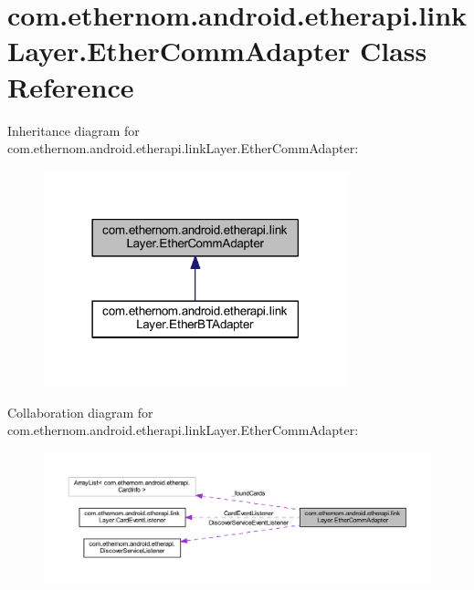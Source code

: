 \hypertarget{classcom_1_1ethernom_1_1android_1_1etherapi_1_1link_layer_1_1_ether_comm_adapter}{}\section{com.\+ethernom.\+android.\+etherapi.\+link\+Layer.\+Ether\+Comm\+Adapter Class Reference}
\label{classcom_1_1ethernom_1_1android_1_1etherapi_1_1link_layer_1_1_ether_comm_adapter}


Inheritance diagram for com.\+ethernom.\+android.\+etherapi.\+link\+Layer.\+Ether\+Comm\+Adapter\+:\nopagebreak
\begin{figure}[H]
\begin{center}
\leavevmode
\includegraphics[width=249pt]{classcom_1_1ethernom_1_1android_1_1etherapi_1_1link_layer_1_1_ether_comm_adapter__inherit__graph}
\end{center}
\end{figure}


Collaboration diagram for com.\+ethernom.\+android.\+etherapi.\+link\+Layer.\+Ether\+Comm\+Adapter\+:\nopagebreak
\begin{figure}[H]
\begin{center}
\leavevmode
\includegraphics[width=350pt]{classcom_1_1ethernom_1_1android_1_1etherapi_1_1link_layer_1_1_ether_comm_adapter__coll__graph}
\end{center}
\end{figure}
